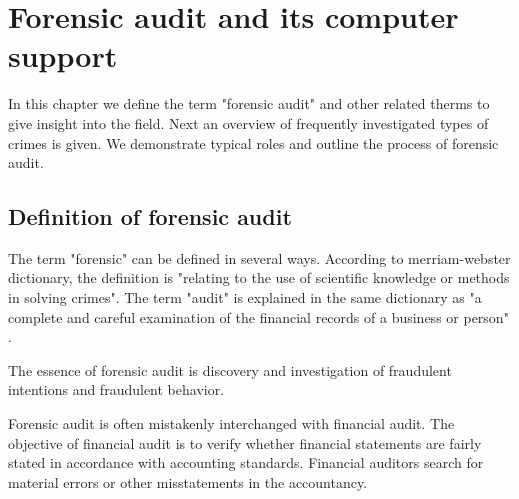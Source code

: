 \chapter{Forensic audit and its computer support}




In this chapter we define the term "forensic audit" and other related therms to give insight into the field. Next an overview of frequently investigated types of crimes is given. We demonstrate typical roles and outline the process of forensic audit. 


\section{Definition of forensic audit}\label{FA_definition}
The term "forensic" can be defined in several ways. According to merriam-webster dictionary, \cite{merriam-forensic} the definition is "relating to the use of scientific knowledge or methods in solving crimes". The term "audit" is explained in the same dictionary as "a complete and careful examination of the financial records of a business or person" \cite{merriam-audit}.

The essence of forensic audit is discovery and investigation of fraudulent intentions and fraudulent behavior. 

Forensic audit is often mistakenly interchanged with financial audit. The objective of financial audit is to verify whether financial statements are fairly stated in accordance with accounting standards. Financial auditors search for material errors or other misstatements in the accountancy.

